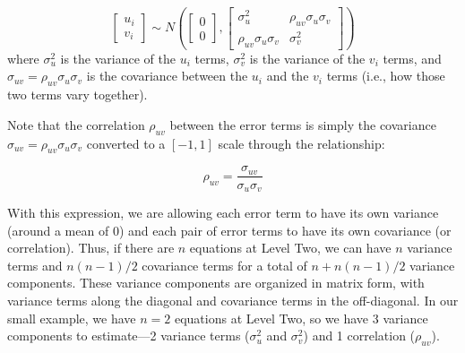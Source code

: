 \documentclass[
]{krantz}
\begin{document}
\begin{equation*} 
\left[ \begin{array}{c}
            u_{i} \\ v_{i}
          \end{array}  \right] \sim N \left( \left[
          \begin{array}{c}
            0 \\ 0
          \end{array} \right], \left[
          \begin{array}{cc}
            \sigma_{u}^{2} & \rho_{uv}\sigma_{u}\sigma_v \\
            \rho_{uv}\sigma_{u}\sigma_v & \sigma_{v}^{2}
          \end{array} \right] \right) 
\end{equation*}
where \(\sigma_{u}^{2}\) is the variance of the \(u_{i}\) terms, \(\sigma_{v}^{2}\) is the variance of the \(v_{i}\) terms, and \(\sigma_{uv} = \rho_{uv}\sigma_{u}\sigma_v\) is the covariance between the \(u_{i}\) and the \(v_{i}\) terms (i.e., how those two terms vary together).

Note that the correlation \(\rho_{uv}\) between the error terms is simply the covariance \(\sigma_{uv}=\rho_{uv}\sigma_{u}\sigma_{v}\) converted to a \([-1,1]\) scale through the relationship:

\begin{equation*}
\rho_{uv} = \frac{\sigma_{uv}}{\sigma_{u}\sigma_{v}}
\end{equation*}

With this expression, we are allowing each error term to have its own variance (around a mean of 0) and each pair of error terms to have its own covariance (or correlation). Thus, if there are \(n\) equations at Level Two, we can have \(n\) variance terms and \(n(n-1)/2\) covariance terms for a total of \(n + n(n-1)/2\) variance components. These variance components are organized in matrix form, with variance terms along the diagonal and covariance terms in the off-diagonal. In our small example, we have \(n=2\) equations at Level Two, so we have 3 variance components to estimate---2 variance terms (\(\sigma_{u}^{2}\) and \(\sigma_{v}^{2}\)) and 1 correlation (\(\rho_{uv}\)).
\end{document}

